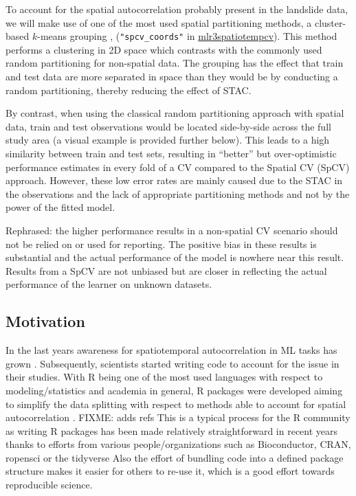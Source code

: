 \documentclass[
]{jss}
\begin{document}
To account for the spatial autocorrelation probably present in the
landslide data, we will make use of one of the most used spatial
partitioning methods, a cluster-based \(k\)-means grouping
\citep{sperrorest}, (\texttt{"spcv\_coords"} in
\href{https://mlr3spatiotempcv.mlr-org.com}{mlr3spatiotempcv}). This
method performs a clustering in 2D space which contrasts with the
commonly used random partitioning for non-spatial data. The grouping has
the effect that train and test data are more separated in space than
they would be by conducting a random partitioning, thereby reducing the
effect of STAC.

By contrast, when using the classical random partitioning approach with
spatial data, train and test observations would be located side-by-side
across the full study area (a visual example is provided further below).
This leads to a high similarity between train and test sets, resulting
in ``better'' but over-optimistic performance estimates in every fold of
a CV compared to the Spatial CV (SpCV) approach. However, these low
error rates are mainly caused due to the STAC in the observations and
the lack of appropriate partitioning methods and not by the power of the
fitted model.

Rephrased: the higher performance results in a non-spatial CV scenario
should not be relied on or used for reporting. The positive bias in
these results is substantial and the actual performance of the model is
nowhere near this result. Results from a SpCV are not unbiased but are
closer in reflecting the actual performance of the learner on unknown
datasets.

\hypertarget{motivation}{%
\subsection{Motivation}\label{motivation}}

In the last years awareness for spatiotemporal autocorrelation in ML
tasks has grown \citep{pohjankukka2017, roberts2017}. Subsequently,
scientists started writing code to account for the issue in their
studies. With R being one of the most used languages with respect to
modeling/statistics and academia in general, R packages were developed
aiming to simplify the data splitting with respect to methods able to
account for spatial autocorrelation \citep[\citet{blockCV}]{cast}.
FIXME: adds refs This is a typical process for the R community as
writing R packages has been made relatively straightforward in recent
years thanks to efforts from various people/organizations such as
Bioconductor, CRAN, ropensci or the tidyverse \citep[\citet{ropensci},
\citet{tidyverse}]{cran} Also the effort of bundling code into a defined
package structure makes it easier for others to re-use it, which is a
good effort towards reproducible science.
\end{document}
